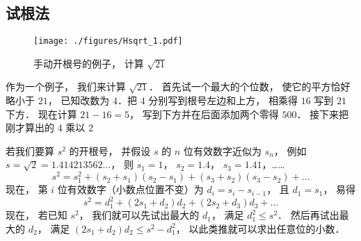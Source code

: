 
\subsection{试根法}

\begin{example}{}
\begin{figure}[ht]
\centering
\texttt{[image: ./figures/Hsqrt\_1.pdf]}
\caption{手动开根号的例子， 计算 $\sqrt{21}$} \label{Hsqrt_fig1}
\end{figure}
作为一个例子， 我们来计算 $\sqrt{21}$． 首先试一个最大的个位数， 使它的平方恰好略小于 $21$， 已知改数为 $4$．把 $4$ 分别写到根号左边和上方， 相乘得 $16$ 写到 $21$ 下方． 现在计算 $21-16 = 5$， 写到下方并在后面添加两个零得 $500$． 接下来把刚才算出的 $4$ 乘以 2 
\end{example}

若我们要算 $s^2$ 的开根号， 并假设 $s$ 的 $n$ 位有效数字近似为 $s_n$， 例如 $s = \sqrt{2} = 1.414213562\dots$， 则 $s_1 = 1$， $s_2=1.4$， $s_3=1.41$，……
\begin{equation}
s^2 = s_1^2 + (s_2+s_1)(s_2-s_1) + (s_3+s_2)(s_3-s_2) + \dots
\end{equation}
现在， 第 $i$ 位有效数字（小数点位置不变）为 $d_i = s_i-s_{i-1}$， 且 $d_1 = s_1$， 易得
\begin{equation}
s^2 = d_1^2 + (2s_1 + d_2)d_2 + (2s_2 + d_3)d_3 + \dots
\end{equation}
现在， 若已知 $s^2$， 我们就可以先试出最大的 $d_1$， 满足 $d_1^2\leqslant s^2$． 然后再试出最大的 $d_2$， 满足 $(2s_1 + d_2)d_2 \leqslant s^2 - d_1^2$， 以此类推就可以求出任意位的小数．
